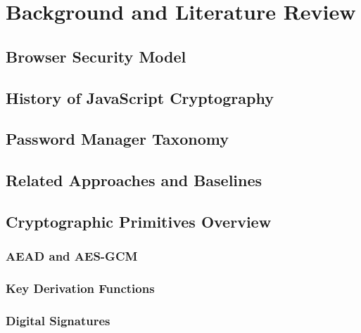 %
%

\chapter{Background and Literature Review}

\section{Browser Security Model}

\section{History of JavaScript Cryptography}

\section{Password Manager Taxonomy}

\section{Related Approaches and Baselines}

\section{Cryptographic Primitives Overview}

\subsection{AEAD and AES-GCM}

\subsection{Key Derivation Functions}

\subsection{Digital Signatures}
